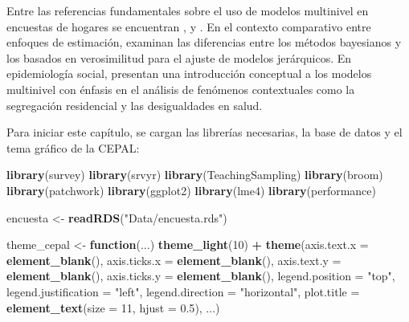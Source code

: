 \documentclass[
  spanish,
  12pt,
]{book}
\newenvironment{Shaded}{\begin{snugshade}}{\end{snugshade}}
\newcommand{\AttributeTok}[1]{\textcolor[rgb]{0.13,0.29,0.53}{#1}}
\newcommand{\ControlFlowTok}[1]{\textcolor[rgb]{0.13,0.29,0.53}{\textbf{#1}}}
\newcommand{\DecValTok}[1]{\textcolor[rgb]{0.00,0.00,0.81}{#1}}
\newcommand{\FloatTok}[1]{\textcolor[rgb]{0.00,0.00,0.81}{#1}}
\newcommand{\FunctionTok}[1]{\textcolor[rgb]{0.13,0.29,0.53}{\textbf{#1}}}
\newcommand{\NormalTok}[1]{#1}
\newcommand{\OtherTok}[1]{\textcolor[rgb]{0.56,0.35,0.01}{#1}}
\newcommand{\SpecialCharTok}[1]{\textcolor[rgb]{0.81,0.36,0.00}{\textbf{#1}}}
\newcommand{\StringTok}[1]{\textcolor[rgb]{0.31,0.60,0.02}{#1}}
\begin{document}
Entre las referencias fundamentales sobre el uso de modelos multinivel en encuestas de hogares se encuentran \citet{goldstein2011multilevel}, \citet{gelman2006data} y \citet{rabehesketh2012multilevel}. En el contexto comparativo entre enfoques de estimación, \citet{browne2006comparison} examinan las diferencias entre los métodos bayesianos y los basados en verosimilitud para el ajuste de modelos jerárquicos. En epidemiología social, \citet{merlo2006brief} presentan una introducción conceptual a los modelos multinivel con énfasis en el análisis de fenómenos contextuales como la segregación residencial y las desigualdades en salud.

Para iniciar este capítulo, se cargan las librerías necesarias, la base de datos y el tema gráfico de la CEPAL:

\begin{Shaded}
\begin{Highlighting}[]
\FunctionTok{library}\NormalTok{(survey)}
\FunctionTok{library}\NormalTok{(srvyr)}
\FunctionTok{library}\NormalTok{(TeachingSampling)}
\FunctionTok{library}\NormalTok{(broom)}
\FunctionTok{library}\NormalTok{(patchwork)}
\FunctionTok{library}\NormalTok{(ggplot2)}
\FunctionTok{library}\NormalTok{(lme4)}
\FunctionTok{library}\NormalTok{(performance)}
\end{Highlighting}
\end{Shaded}

\begin{Shaded}
\begin{Highlighting}[]
\NormalTok{encuesta }\OtherTok{\textless{}{-}} \FunctionTok{readRDS}\NormalTok{(}\StringTok{"Data/encuesta.rds"}\NormalTok{)}
\end{Highlighting}
\end{Shaded}

\begin{Shaded}
\begin{Highlighting}[]
\NormalTok{theme\_cepal }\OtherTok{\textless{}{-}} \ControlFlowTok{function}\NormalTok{(...) }\FunctionTok{theme\_light}\NormalTok{(}\DecValTok{10}\NormalTok{) }\SpecialCharTok{+}
  \FunctionTok{theme}\NormalTok{(}\AttributeTok{axis.text.x      =} \FunctionTok{element\_blank}\NormalTok{(),}
        \AttributeTok{axis.ticks.x     =} \FunctionTok{element\_blank}\NormalTok{(),}
        \AttributeTok{axis.text.y      =} \FunctionTok{element\_blank}\NormalTok{(),}
        \AttributeTok{axis.ticks.y     =} \FunctionTok{element\_blank}\NormalTok{(),}
        \AttributeTok{legend.position  =} \StringTok{"top"}\NormalTok{,}
        \AttributeTok{legend.justification =} \StringTok{"left"}\NormalTok{,}
        \AttributeTok{legend.direction =} \StringTok{"horizontal"}\NormalTok{,}
        \AttributeTok{plot.title       =} \FunctionTok{element\_text}\NormalTok{(}\AttributeTok{size =} \DecValTok{11}\NormalTok{, }\AttributeTok{hjust =} \FloatTok{0.5}\NormalTok{),}
\NormalTok{        ...)}
\end{Highlighting}
\end{Shaded}
\end{document}
